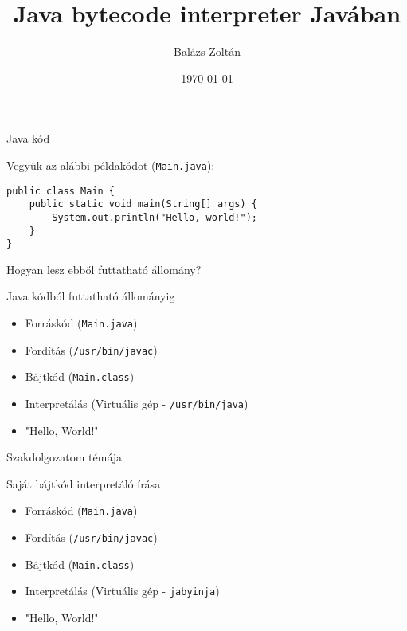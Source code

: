 \documentclass[14pt, aspectratio=1610]{beamer}
\title{Java bytecode interpreter Javában}
\institute{Eötvös Loránd Tudományegyetem}
\author{Balázs Zoltán}
\date{\today}
\begin{document}
\maketitle

\begin{frame}[fragile]{Java kód}

Vegyük az alábbi példakódot (\texttt{Main.java}):
\begin{verbatim}
public class Main {
    public static void main(String[] args) {
        System.out.println("Hello, world!");
    }
}
\end{verbatim}
Hogyan lesz ebből futtatható állomány?

\end{frame}

\begin{frame}[fragile]{Java kódból futtatható állományig}

\begin{itemize}
    \item<+-> Forráskód (\texttt{Main.java})
    \item<+-> Fordítás (\texttt{/usr/bin/javac})
    \item<+-> Bájtkód (\texttt{Main.class})
    \item<+-> Interpretálás (Virtuális gép - \texttt{/usr/bin/java})
    \item<+-> "Hello, World!"
\end{itemize}

\end{frame}

\begin{frame}{Szakdolgozatom témája}

Saját bájtkód interpretáló írása

\begin{itemize}
    \item<2-> Forráskód (\texttt{Main.java})
    \item<2-> Fordítás (\texttt{/usr/bin/javac})
    \item<2-> Bájtkód (\texttt{Main.class})
    \item<2-> Interpretálás (Virtuális gép - \alert{\texttt{jabyinja}})
    \item<2-> "Hello, World!"
\end{itemize}
    
\end{frame}
\end{document}

